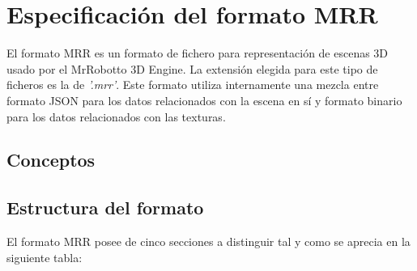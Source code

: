 
\chapter{Especificación del formato MRR} %

\label{AppendixA} %


El formato MRR es un formato de fichero para representación de escenas 3D usado por el MrRobotto 3D Engine.
La extensión elegida para este tipo de ficheros es la de \textit{'.mrr'}.
Este formato utiliza internamente una mezcla entre formato JSON para los datos relacionados con la escena en sí y formato binario para los datos relacionados con las texturas.


\section{Conceptos}

\section{Estructura del formato}
El formato MRR posee de cinco secciones a distinguir tal y como se aprecia en la siguiente tabla:

\clearpage


